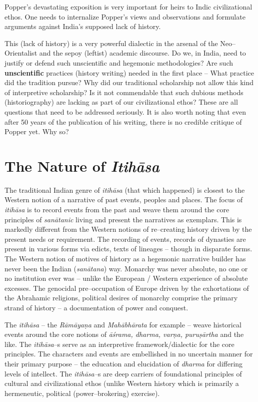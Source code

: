 Popper’s devastating exposition is very important for heirs to Indic civilizational ethos. One needs to internalize Popper’s views and observations and formulate arguments against India’s supposed lack of history.

This (lack of history) is a very powerful dialectic in the arsenal of the Neo–Orientalist and the sepoy (leftist) academic discourse. Do we, in India, need to justify or defend such unscientific and hegemonic methodologies? Are such \textbf{unscientific} practices (history writing) needed in the first place – What practice did the tradition pursue? Why did our traditional scholarship not allow this kind of interpretive scholarship? Is it not commendable that such dubious methods (historiography) are lacking as part of our civilizational ethos? These are all questions that need to be addressed seriously. It is also worth noting that even after 50 years of the publication of his writing, there is no credible critique of Popper yet. Why so?


\section*{The Nature of \textit{Itihāsa}}

The traditional Indian genre of \textit{itihāsa} (that which happened) is closest to the Western notion of a narrative of past events, peoples and places. The focus of \textit{itihāsa} is to record events from the past and weave them around the core principles of \textit{sanātanic} living and present the narratives as exemplars. This is markedly different from the Western notions of re–creating history driven by the present needs or requirement. The recording of events, records of dynasties are present in various forms via edicts, texts of lineages – though in disparate forms. The Western notion of motives of history as a hegemonic narrative builder has never been the Indian (\textit{sanātana}) way. Monarchy was never absolute, no one or no institution ever was – unlike the European / Western experience of absolute excesses. The genocidal pre–occupation of Europe driven by the exhortations of the Abrahamic religions, political desires of monarchy comprise the primary strand of history – a documentation of power and conquest.

The \textit{itihāsa} – the \textit{Rāmāyaṇa} and \textit{Mahābhārata} for example – weave historical events around the core notions of \textit{āśrama, dharma, varṇa, puruṣārtha} and the like. The \textit{itihāsa}–s serve as an interpretive framework/dialectic for the core principles. The characters and events are embellished in no uncertain manner for their primary purpose – the education and elucidation of \textit{dharma} for differing levels of intellect. The \textit{itihāsa–}s are deep carriers of foundational principles of cultural and civilizational ethos (unlike Western history which is primarily a hermeneutic, political (power–brokering) exercise).

